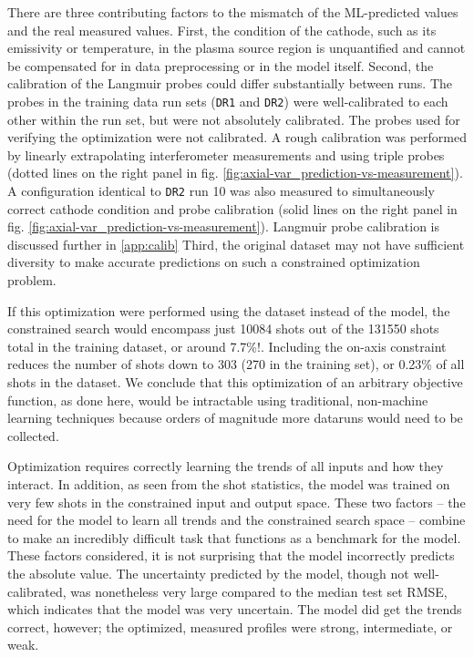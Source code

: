There are three contributing factors to the mismatch of the ML-predicted values and the real measured values. First, the condition of the cathode, such as its emissivity or temperature, in the plasma source region is unquantified and cannot be compensated for in data preprocessing or in the model itself. Second, the calibration of the Langmuir probes could differ substantially between runs. The probes in the training data run sets (\texttt{DR1} and \texttt{DR2}) were well-calibrated to each other within the run set, but were not absolutely calibrated. The probes used for verifying the optimization were not calibrated. A rough calibration was performed by linearly extrapolating interferometer measurements and using triple probes (dotted lines on the right panel in fig. \ref{fig:axial-var_prediction-vs-measurement}). A configuration identical to \texttt{DR2} run 10 was also measured to simultaneously correct cathode condition and probe calibration (solid lines on the right panel in fig. \ref{fig:axial-var_prediction-vs-measurement}). Langmuir probe calibration is discussed further in \ref{app:calib} Third, the original dataset may not have sufficient diversity to make accurate predictions on such a constrained optimization problem.

If this optimization were performed using the dataset instead of the model, the constrained search would encompass just 10084 shots out of the 131550 shots total in the training dataset, or around 7.7\%!. Including the on-axis constraint reduces the number of shots down to 303 (270 in the training set), or 0.23\% of all shots in the dataset. We conclude that this optimization of an arbitrary objective function, as done here, would be intractable using traditional, non-machine learning techniques because orders of magnitude more dataruns would need to be collected. 

Optimization requires correctly learning the trends of all inputs and how they interact. In addition, as seen from the shot statistics, the model was trained on very few shots in the constrained input and output space. These two factors -- the need for the model to learn all trends and the constrained search space -- combine to make an incredibly difficult task that functions as a benchmark for the model. These factors considered, it is not surprising that the model incorrectly predicts the absolute value. The uncertainty predicted by the model, though not well-calibrated, was nonetheless very large compared to the median test set RMSE, which indicates that the model was very uncertain. The model did get the trends correct, however; the optimized, measured profiles were strong, intermediate, or weak.


